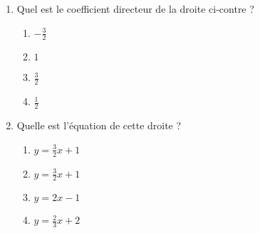 
\begin{exercice}\label{exosmath-0393}

    \begin{minipage}{0.485\textwidth}

        \begin{enumerate}
            \item
    Quel est le coefficient directeur de la droite ci-contre ?

        \begin{enumerate}
            \item
                \( -\frac{ 3 }{ 2 }\)
            \item
                \( 1\)
            \item
                \( \frac{ 3 }{ 2 }\)
            \item
                \( \frac{ 1 }{2}\)
        \end{enumerate}

    \item
        Quelle est l'équation de cette droite ?

        \begin{enumerate}
            \item
                \( y=\frac{ 3 }{2}x+1\)
            \item
                \( y=\frac{ 3 }{ 2 }x+1\)
            \item
                \( y=2x-1\)
            \item
                \( y=\frac{ 2 }{ 3 }x+2\)
        \end{enumerate}

        \end{enumerate}

    \end{minipage}
    \hspace{1mm}    
    \begin{minipage}{0.485\textwidth}
\begin{center}

\end{center}
    \end{minipage}

\end{exercice}
